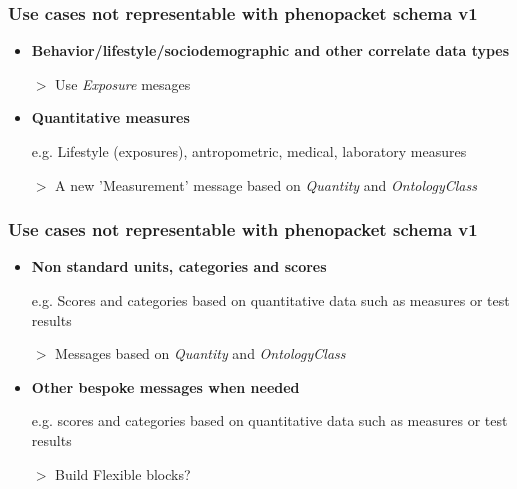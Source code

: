 \documentclass{beamer}
\begin{document}
\begin{frame}
\frametitle{Use cases not representable with phenopacket schema v1}
\begin{itemize}

\item \textbf{Behavior/lifestyle/sociodemographic and other correlate data types}
\item[$>$] Use \textit{Exposure} mesages

\item \textbf{Quantitative measures} 
\begin{block}{}
e.g. Lifestyle (exposures), antropometric, medical, laboratory measures
\end{block}
\item[$>$] A new 'Measurement' message based on \textit{Quantity} and \textit{OntologyClass}

\end{itemize}
\end{frame}


\begin{frame}
\frametitle{Use cases not representable with phenopacket schema v1}
\begin{itemize}


\item \textbf{Non standard units, categories and scores}
\begin{block}{}
e.g. Scores and categories based on quantitative data such as measures or test results
\end{block}
\item[$>$] Messages based on \textit{Quantity} and \textit{OntologyClass} 


\item \textbf{Other bespoke messages when needed}
\begin{block}{}
e.g. scores and categories based on quantitative data such as measures or test results
\end{block}
\item[$>$] Build Flexible blocks?

\end{itemize}
\end{frame}


\end{document}
